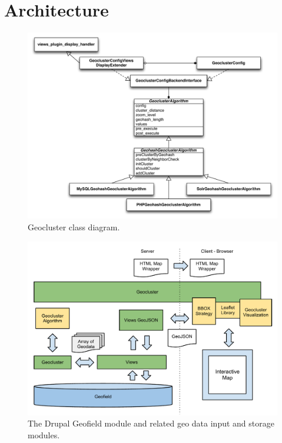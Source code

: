 
%
%

\section{Architecture}
\label{chapter:architecture}


\begin{figure}[h]
  \begin{center}
    \includegraphics[width=1\textwidth]{figures/geocluster_class_diagram.pdf}
    \caption{Geocluster class diagram.}
    \label{fig:geofield}
  \end{center}
\end{figure}


\begin{figure}[h]
  \begin{center}
    \includegraphics[width=1\textwidth]{figures/geocluster_architecture.pdf}
    \caption{The Drupal Geofield module and related geo data input and storage modules.}
    \label{fig:geofield}
  \end{center}
\end{figure}



